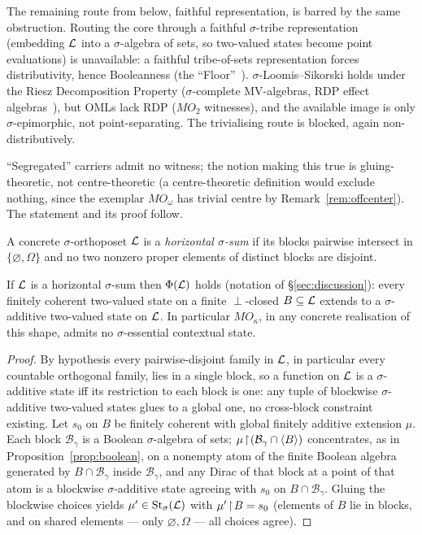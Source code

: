 The remaining route from below, faithful representation, is barred by the same
obstruction. Routing the core through a faithful $\sigma$-tribe
representation (embedding $\mathcal{L}$ into a $\sigma$-algebra of sets, so two-valued states
become point evaluations) is unavailable: a faithful tribe-of-sets representation forces
distributivity, hence Booleanness (the ``Floor''~\cite{PtakPulmannova1991}).
$\sigma$-Loomis--Sikorski holds under the Riesz Decomposition Property
($\sigma$-complete MV-algebras, RDP effect algebras~\cite{Dvurecenskij2000}), but
OMLs lack RDP ($MO_2$ witnesses), and the available image is only $\sigma$-epimorphic,
not point-separating. The trivialising route is blocked, again non-distributively.

``Segregated'' carriers admit no witness; the notion making this true is
gluing-theoretic, not centre-theoretic (a centre-theoretic definition would
exclude nothing, since the exemplar $MO_\omega$ has trivial centre by
Remark~\ref{rem:offcenter}). The statement and its proof follow.

\begin{definition}\label{def:horizontal}
A concrete $\sigma$-orthoposet $\mathcal{L}$ is a \emph{horizontal $\sigma$-sum} if its
blocks pairwise intersect in $\{\varnothing,\Omega\}$ and no two nonzero proper
elements of distinct blocks are disjoint.
\end{definition}

\begin{lemma}\label{lem:horizontal}
If $\mathcal{L}$ is a horizontal $\sigma$-sum then $\Phi(\mathcal{L})$ holds
(notation of \S\ref{sec:discussion}): every finitely coherent two-valued state on
a finite $\perp$-closed $B\subseteq\mathcal{L}$ extends to a $\sigma$-additive two-valued
state on $\mathcal{L}$. In particular $MO_\kappa$, in any concrete realisation of this
shape, admits no $\sigma$-essential contextual state.
\end{lemma}

\begin{proof}
By hypothesis every pairwise-disjoint family in $\mathcal{L}$, in particular every
countable orthogonal family, lies in a single block, so a function on $\mathcal{L}$ is a
$\sigma$-additive state iff its restriction to each block is one: any tuple of
blockwise $\sigma$-additive two-valued states glues to a global one, no
cross-block constraint existing. Let $s_0$ on $B$ be finitely coherent with
global finitely additive extension $\mu$. Each block $\mathcal B_\gamma$ is a
Boolean $\sigma$-algebra of sets; $\mu\!\restriction\!(\mathcal B_\gamma\cap\langle
B\rangle)$ concentrates, as in Proposition~\ref{prop:boolean}, on a nonempty atom
of the finite Boolean algebra generated by $B\cap\mathcal B_\gamma$ inside
$\mathcal B_\gamma$, and any Dirac of that block at a point of that atom is a
blockwise $\sigma$-additive state agreeing with $s_0$ on $B\cap\mathcal B_\gamma$.
Gluing the blockwise choices yields $\mu'\in\mathrm{St}_\sigma(\mathcal{L})$ with
$\mu'\!\restriction\! B=s_0$ (elements of $B$ lie in blocks, and on shared elements
--- only $\varnothing,\Omega$ --- all choices agree).
\end{proof}

